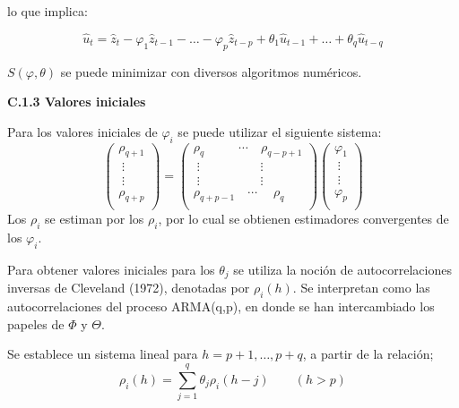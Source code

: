 lo que implica:

\[
\hat{u}_{t} =\hat{z}_{t} -\varphi_{1} \hat{z}_{t-1} -\ldots -\varphi_{p} \hat{z}_{t-p} +\theta_{1} \hat{u}_{t-1} +\ldots +\theta_{q} \hat{u}_{t-q} 
\]

$S(\varphi, \theta)$ se puede minimizar con diversos algoritmos num\'{e}ricos.\newline

\textbf{C.1.3 Valores iniciales}\newline

Para los valores iniciales de $\varphi_{i}$ se puede utilizar el siguiente sistema:
\[
\left( {\begin{array}{l}
 \rho_{q+1} \\ 
 \;\vdots \\ 
 \;\vdots \\ 
 \rho_{q+p} \\ 
 \end{array}} \right)=\left( {\begin{array}{l}
 \rho_{q\quad } \quad \quad \cdots \quad \rho_{q-p+1} \\ 
 \;\vdots \quad \quad \quad \;\quad \;\;\vdots \\ 
 \;\vdots \quad \quad \quad \;\quad \;\;\vdots \\ 
 \rho_{q+p-1} \quad \cdots \quad \;\rho_{q} \\ 
 \end{array}} \right)\left( {\begin{array}{l}
 \varphi_{1} \\ 
 \;\vdots \\ 
 \;\vdots \\ 
 \varphi_{p} \\ 
 \end{array}} \right)
\]
Los $\rho_{i}$ se estiman por los $\rho_{i}$, por lo cual se obtienen estimadores convergentes de los $\varphi_{i}$.\newline

Para obtener valores iniciales para los $\theta_{j}$ se utiliza la noci\'{o}n de autocorrelaciones inversas de Cleveland (1972), denotadas por $\rho_{i}(h)$. Se interpretan como las autocorrelaciones del proceso ARMA(q,p), en donde se han intercambiado los papeles de $\Phi$ y $\Theta$.\newline

Se establece un sistema lineal para $h=p+1,\ldots,p+q$, a partir de la relaci\'{o}n;
\[
\rho_{i} (h)=\sum_{j=1}^q \theta_{j} \rho_{i} (h-j) \qquad (h>p)
\]

